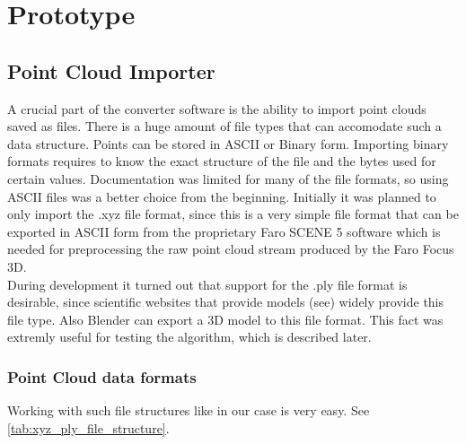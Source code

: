 \section{Prototype}

\subsection{Point Cloud Importer}

A crucial part of the converter software is the ability to import point clouds saved as files. There is a huge amount of file types that can accomodate such a data structure. Points can be stored in ASCII or Binary form. Importing binary formats requires to know the exact structure of the file and the bytes used for certain values. Documentation was limited for many of the file formats, so using ASCII files was a better choice from the beginning. Initially it was planned to only import the .xyz file format, since this is a very simple file format that can be exported in ASCII form from the proprietary Faro SCENE 5 software which is needed for preprocessing the raw point cloud stream produced by the Faro Focus 3D.\\
During development it turned out that support for the .ply file format is desirable, since scientific websites that provide models (see) widely provide this file type. Also Blender can export a 3D model to this file format. This fact was extremly useful for testing the algorithm, which is described later.

\subsubsection{Point Cloud data formats}

Working with such file structures like in our case is very easy. See \ref{tab:xyz_ply_file_structure}.


